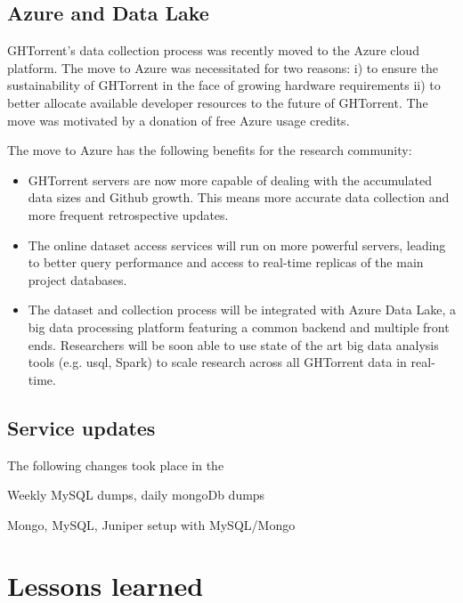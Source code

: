\documentclass{sig-alternate}
\begin{document}
\subsection{Azure and Data Lake}

GHTorrent's data collection process was recently moved to the Azure cloud
platform. The move to Azure was necessitated for two reasons: i) to ensure the
sustainability of GHTorrent in the face of growing hardware requirements ii) to
better allocate available developer resources to the future of GHTorrent. The
move was motivated by a donation of free Azure usage credits.

The move to Azure has the following benefits for the research community:

\begin{itemize}

  \item GHTorrent servers are now more capable of dealing with the accumulated
    data sizes and Github growth. This means more accurate data collection
    and more frequent retrospective updates.

  \item The online dataset access services will run on more powerful servers,
    leading to better query performance and access to real-time replicas of
    the main project databases.

  \item The dataset and collection process will be integrated with Azure
    Data Lake, a big data processing platform featuring a common backend
    and multiple front ends. Researchers will be soon able to use state
    of the art big data analysis tools (e.g. {\sc usql}, Spark) to scale
    research across all GHTorrent data in real-time.

\end{itemize}


\subsection{Service updates}

The following changes took place in the 

Weekly MySQL dumps, daily mongoDb dumps

Mongo, MySQL, Juniper setup with MySQL/Mongo

\section{Lessons learned}
\end{document}
